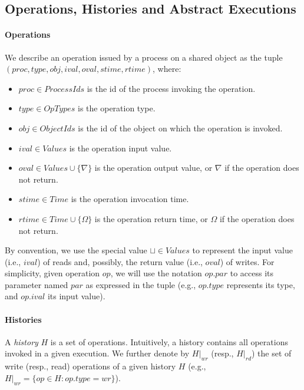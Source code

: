 \documentclass[letter, 11pt]{article}
\begin{document}
\subsection{Operations, Histories and Abstract Executions}

\paragraph{Operations}
We describe an operation issued by a process on a shared object as the tuple
$(proc, type, obj, ival, oval, stime, rtime)$, where:
\begin{itemize}
\item $proc \in \mathit{ProcessIds}$ is the id of the process invoking the operation.
\item $type \in \mathit{OpTypes}$ is the operation type.
\item $obj \in \mathit{ObjectIds}$ is the id of the object on which the operation is invoked.
\item $ival \in \mathit{Values}$ is the operation input value.
\item $oval \in \mathit{Values} \cup \{\nabla\}$ is the operation output value, or $\nabla$ if the operation does not  return.
\item $stime \in \mathit{Time}$ is the operation invocation time.
\item $rtime \in \mathit{Time} \cup \{\Omega\}$ is the operation return time, or $\Omega$ if the operation does not  return.
\end{itemize}
By convention, we use the special value $\sqcup \in \mathit{Values}$ to represent the input value (i.e., $ival$) of reads
and, possibly, the return value (i.e., $oval$) of writes.
For simplicity, given operation $op$, we will use the notation $op.par$ to access its parameter 
named $par$ as expressed in the tuple (e.g., $op.type$ represents its type, and $op.ival$ its input value).


\paragraph{Histories}
A \emph{history} $H$ is a set of operations. Intuitively, a history contains all operations invoked in a given execution. We further denote by $H|_{wr}$ (resp., $H|_{rd}$) the set of write (resp., read) operations 
of a given history $H$ (e.g., $H|_{wr}=\{op\in H: op.type=wr\}$).
\end{document}
